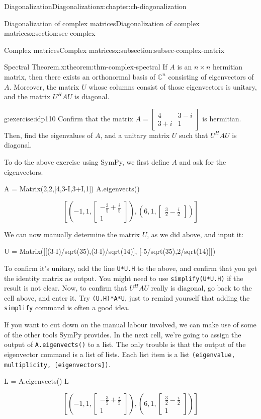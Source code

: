 \documentclass[oneside,10pt,]{book}
\newcommand{\mono}[1]{\texttt{#1}}
\numberwithin{equation}{section}
\newcommand{\bbm}{\begin{bmatrix}}
\newcommand{\ebm}{\end{bmatrix}}
\newcommand{\C}{\mathbb{C}}
\newcommand{\amp}{&}
\begin{document}
\begin{chapterptx}{Diagonalization}{}{Diagonalization}{}{}{x:chapter:ch-diagonalization}
\begin{sectionptx}{Diagonalization of complex matrices}{}{Diagonalization of complex matrices}{}{}{x:section:sec-complex}
\begin{subsectionptx}{Complex matrices}{}{Complex matrices}{}{}{x:subsection:subsec-complex-matrix}
\begin{theorem}{Spectral Theorem.}{}{x:theorem:thm-complex-spectral}%
If \(A\) is an \(n\times n\) hermitian matrix, then there exists an orthonormal basis of \(\C^n\) consisting of eigenvectors of \(A\). Moreover, the matrix \(U\) whose columns consist of those eigenvectors is unitary, and the matrix \(U^HAU\) is diagonal.%
\end{theorem}
\begin{inlineexercise}{}{g:exercise:idp110}%
Confirm that the matrix \(A = \bbm 4 \amp 3-i\\3+i\amp 1\ebm\) is hermitian. Then, find the eigenvalues of \(A\), and a unitary matrix \(U\) such that \(U^HAU\) is diagonal.%
\end{inlineexercise}%
To do the above exercise using SymPy, we first define \(A\) and ask for the eigenvectors.%
\begin{sageinput}
A = Matrix(2,2,[4,3-I,3+I,1])
A.eigenvects()
\end{sageinput}
\begin{sageoutput}
\[\left[\left(-1,1,\bbm -\frac35+\frac{i}{5}\\1\ebm\right),\left(6,1,\bbm \frac32-\frac{i}{2}\ebm\right)\right]\]
\end{sageoutput}
We can now manually determine the matrix \(U\), as we did above, and input it:%
\begin{sageinput}
U = Matrix([[(3-I)/sqrt(35),(3-I)/sqrt(14)],
            [-5/sqrt(35),2/sqrt(14)]])
\end{sageinput}
To confirm it's unitary, add the line \mono{U*U.H} to the above, and confirm that you get the identity matrix as output. You might need to use \mono{simplify(U*U.H)} if the result is not clear. Now, to confirm that \(U^HAU\) really is diagonal, go back to the cell above, and enter it. Try \mono{(U.H)*A*U}, just to remind yourself that adding the \mono{simplify} command is often a good idea.%
\par
If you want to cut down on the manual labour involved, we can make use of some of the other tools SymPy provides. In the next cell, we're going to assign the output of \mono{A.eigenvects()} to a list. The only trouble is that the output of the eigenvector command is a list of lists. Each list item is a list \mono{(eigenvalue, multiplicity, [eigenvectors])}.%
\begin{sageinput}
L = A.eigenvects()
L
\end{sageinput}
\begin{sageoutput}
\[\left[\left(-1,1,\bbm -\frac35+\frac{i}{5}\\1\ebm\right), \left(6,1,\bbm \frac32-\frac{i}{2}\\1\ebm\right)\right]\]

\end{sageoutput}
\end{subsectionptx}
\end{sectionptx}
\end{chapterptx}
\end{document}

